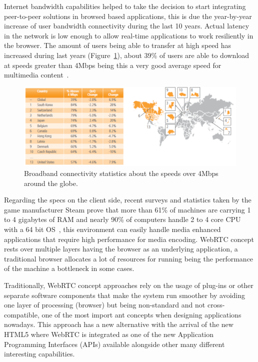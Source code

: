 Internet bandwidth capabilities helped to take the decision to start integrating peer-to-peer solutions in browsed based applications, this is due the year-by-year increase of user bandwidth connectivity during the last 10 years. Actual latency in the network is low enough to allow real-time applications to work resiliently in the browser. The amount of users being able to transfer at high speed has increased during last years (Figure~\ref{fig:bwWorldAvg}), about 39\% of users are able to download at speeds greater than 4Mbps being this a very good average speed for multimedia content~\cite{akamaiq2}.

\begin{figure}[h]
  \centering
    \includegraphics[width=1\textwidth]{./figures/internetstats.pdf}
      \caption[Broadband over 4Mbps connectivity statistics]{Broadband connectivity statistics about the speeds over 4Mbps around the globe.}
	\label{fig:bwWorldAvg}
\end{figure}

Regarding the specs on the client side, recent surveys and statistics taken by the game manufacturer Steam prove that more than  61\% of machines are carrying 1 to 4 gigabytes of RAM and nearly 90\% of computers handle 2 to 4 core CPU with a 64 bit OS~\cite{steamStats}, this environment can easily handle media enhanced applications that require high performance for media encoding. WebRTC concept rests over multiple layers having the browser as an underlying application, a traditional browser allocates a lot of resources for running being the performance of the machine a bottleneck in some cases.

Traditionally, WebRTC concept approaches rely on the usage of plug-ins or other separate software components that make the system run smoother by avoiding one layer of processing (browser) but being non-standard and not cross-compatible, one of the most import ant concepts when designing applications nowadays. This approach has a new alternative with the arrival of the new HTML5 where WebRTC is integrated as one of the new Application Programming Interfaces (APIs) available alongside other many different interesting capabilities.

